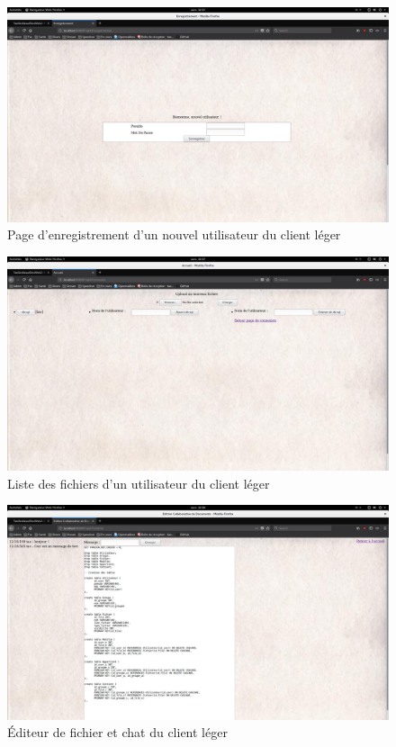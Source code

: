 \documentclass[a4paper, 12pt]{article}
\begin{document}
\begin{figure}[H]
  \begin{center}
    \includegraphics[scale=0.2]{enregistrement_leger.png}
  \end{center}
  \caption{Page d'enregistrement d'un nouvel utilisateur du client léger}
\end{figure}

\begin{figure}[H]
  \begin{center}
    \includegraphics[scale=0.2]{fichier_leger.png}
  \end{center}
  \caption{Liste des fichiers d'un utilisateur du client léger}
\end{figure}

\begin{figure}[H]
  \begin{center}
    \includegraphics[scale=0.2]{editeur_leger}
  \end{center}
  \caption{Éditeur de fichier et chat du client léger}
\end{figure}
\end{document}
